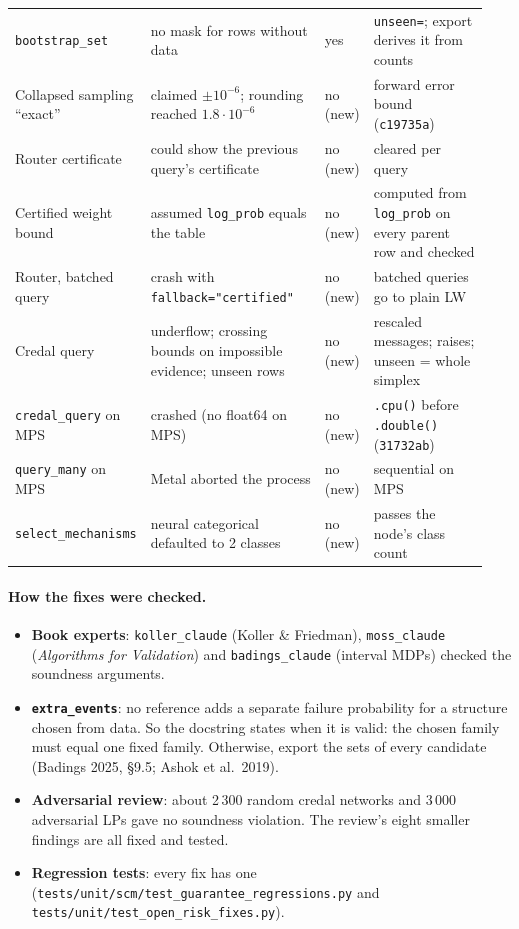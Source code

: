 \documentclass[10pt,a4paper]{article}
\newcommand{\code}[1]{\texttt{#1}}
\begin{document}
\begin{table}[H]
{\begin{tabular}{>{\raggedright\arraybackslash}p{0.2\linewidth}>{\raggedright\arraybackslash}p{0.38\linewidth}>{\centering\arraybackslash}p{0.09\linewidth}>{\raggedright\arraybackslash}p{0.27\linewidth}}
\code{bootstrap\_set} & no mask for rows without data & yes & \code{unseen=}; export derives it from counts \\
Collapsed sampling ``exact'' & claimed $\pm10^{-6}$; rounding reached $1.8\cdot10^{-6}$ & no (new) & forward error bound (\code{c19735a}) \\
Router certificate & could show the previous query's certificate & no (new) & cleared per query \\
Certified weight bound & assumed \code{log\_prob} equals the table & no (new) & computed from \code{log\_prob} on every parent row and checked \\
Router, batched query & crash with \code{fallback="certified"} & no (new) & batched queries go to plain LW \\
Credal query & underflow; crossing bounds on impossible evidence; unseen rows & no (new) & rescaled messages; raises; unseen = whole simplex \\
\code{credal\_query} on MPS & crashed (no float64 on MPS) & no (new) & \code{.cpu()} before \code{.double()} (\code{31732ab}) \\
\code{query\_many} on MPS & Metal aborted the process & no (new) & sequential on MPS \\
\code{select\_mechanisms} & neural categorical defaulted to 2 classes & no (new) & passes the node's class count \\ \bottomrule
\end{tabular}}
\end{table}

\paragraph{How the fixes were checked.}
\begin{itemize}
\item \textbf{Book experts}: \code{koller\_claude} (Koller \& Friedman), \code{moss\_claude} (\emph{Algorithms for Validation}) and \code{badings\_claude} (interval MDPs) checked the soundness arguments.
\item \textbf{\code{extra\_events}}: no reference adds a separate failure probability for a structure chosen from data. So the docstring states when it is valid: the chosen family must equal one fixed family. Otherwise, export the sets of every candidate (Badings 2025, §9.5; Ashok et al.~2019).
\item \textbf{Adversarial review}: about 2\,300 random credal networks and 3\,000 adversarial LPs gave no soundness violation. The review's eight smaller findings are all fixed and tested.
\item \textbf{Regression tests}: every fix has one (\code{tests/unit/scm/}\allowbreak\code{test\_guarantee\_regressions.py} and \code{tests/unit/}\allowbreak\code{test\_open\_risk\_fixes.py}).
\end{itemize}
\end{document}
